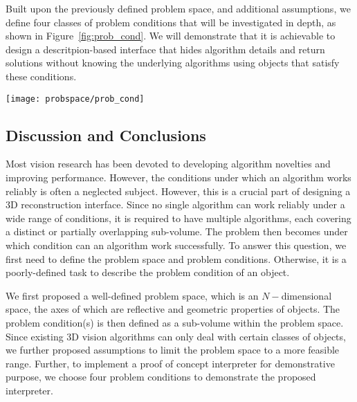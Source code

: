 Built upon the previously defined problem space, and additional assumptions, we define four classes of problem conditions that will be investigated in depth, as shown in Figure~\ref{fig:prob_cond}. We will demonstrate that it is achievable to design a descritpion-based interface that hides algorithm details and return solutions without knowing the underlying algorithms using objects that satisfy these conditions.
\begin{figure*}[!htbp]
\centering
\texttt{[image: probspace/prob\_cond]}
\caption{Four problem conditions selected based on the definition of problem space and additional assumptions. The description-based interface will be evaluated using objects satisfying these conditions.}
\label{fig:prob_cond}
\end{figure*}

\subsection{Discussion and Conclusions}
Most vision research has been devoted to developing algorithm novelties and improving performance. However, the conditions under which an algorithm works reliably is often a neglected subject. However, this is a crucial part of designing a 3D reconstruction interface. Since no single algorithm can work reliably under a wide range of conditions, it is required to have multiple algorithms, each covering a distinct or partially overlapping sub-volume. The problem then becomes under which condition can an algorithm work successfully. To answer this question, we first need to define the problem space and problem conditions. Otherwise, it is a poorly-defined task to describe the problem condition of an object.

We first proposed a well-defined problem space, which is an $N-$dimensional space, the axes of which are reflective and geometric properties of objects. The problem condition(s) is then defined as a sub-volume within the problem space. Since existing 3D vision algorithms can only deal with certain classes of objects, we further proposed assumptions to limit the problem space to a more feasible range. Further, to implement a proof of concept interpreter for demonstrative purpose, we choose four problem conditions to demonstrate the proposed interpreter.

